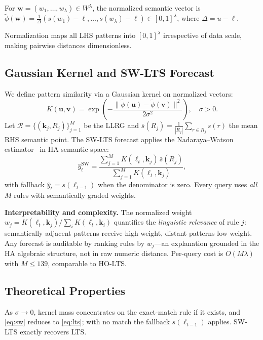 \documentclass{llncs}
\begin{document}
\begin{definition}
For $\bm{w}=(w_1,\ldots,w_\lambda)\in W^\lambda$, the normalized
semantic vector is
$\tilde\phi(\bm{w})=\tfrac{1}{\Delta}(s(w_1)-\ell,\ldots,
s(w_\lambda)-\ell)\in[0,1]^\lambda$, where $\Delta=u-\ell$.
\end{definition}

Normalization maps all LHS patterns into $[0,1]^\lambda$ irrespective
of data scale, making pairwise distances dimensionless.

\subsection{Gaussian Kernel and SW-LTS Forecast}

We define pattern similarity via a Gaussian kernel on normalized vectors:
\begin{equation}
  K(\bm{u},\bm{v})
  = \exp\!\left(
    -\frac{\|\tilde\phi(\bm{u})-\tilde\phi(\bm{v})\|^2}{2\sigma^2}
    \right), \quad \sigma>0.
\label{eq:kernel}
\end{equation}
Let $\mathcal{R}=\{(\bm{k}_j,R_j)\}_{j=1}^{M}$ be the LLRG and
$\bar{s}(R_j)=\frac{1}{|R_j|}\sum_{r\in R_j}s(r)$ the mean RHS
semantic point. The SW-LTS forecast applies the
Nadaraya--Watson estimator~\cite{nadaraya1964} in HA semantic space:
\begin{equation}
  \hat{y}_t^{\mathrm{SW}}
  = \frac{\sum_{j=1}^{M}K(\bm{\ell}_t,\bm{k}_j)\,\bar{s}(R_j)}
         {\sum_{j=1}^{M}K(\bm{\ell}_t,\bm{k}_j)},
\label{eq:sw}
\end{equation}
with fallback $\hat{y}_t=s(\ell_{t-1})$ when the denominator is zero.
Every query uses \emph{all} $M$ rules with semantically graded weights.

\smallskip\noindent\textbf{Interpretability and complexity.}
The normalized weight $w_j = K(\bm{\ell}_t,\bm{k}_j)/\sum_i
K(\bm{\ell}_t,\bm{k}_i)$ quantifies the \emph{linguistic relevance}
of rule $j$: semantically adjacent patterns receive high weight,
distant patterns low weight. Any forecast is auditable by ranking
rules by $w_j$---an explanation grounded in the HA algebraic
structure, not in raw numeric distance. Per-query cost is
$O(M\lambda)$ with $M{\leq}139$, comparable to HO-LTS.

\subsection{Theoretical Properties}

\begin{proposition}
\label{prop:sigma0}
As $\sigma\to 0$, kernel mass concentrates on the exact-match rule if
it exists, and \eqref{eq:sw} reduces to \eqref{eq:lts}; with no match
the fallback $s(\ell_{t-1})$ applies. SW-LTS exactly recovers LTS.
\end{proposition}
\end{document}

